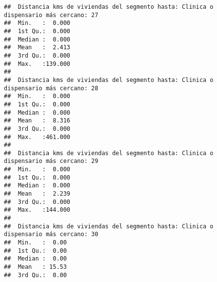 \documentclass[11pt,]{article}
\begin{document}
\begin{verbatim}
##  Distancia kms de viviendas del segmento hasta: Clinica o dispensario más cercano: 27
##  Min.   :  0.000                                                                     
##  1st Qu.:  0.000                                                                     
##  Median :  0.000                                                                     
##  Mean   :  2.413                                                                     
##  3rd Qu.:  0.000                                                                     
##  Max.   :139.000                                                                     
##                                                                                      
##  Distancia kms de viviendas del segmento hasta: Clinica o dispensario más cercano: 28
##  Min.   :  0.000                                                                     
##  1st Qu.:  0.000                                                                     
##  Median :  0.000                                                                     
##  Mean   :  8.316                                                                     
##  3rd Qu.:  0.000                                                                     
##  Max.   :461.000                                                                     
##                                                                                      
##  Distancia kms de viviendas del segmento hasta: Clinica o dispensario más cercano: 29
##  Min.   :  0.000                                                                     
##  1st Qu.:  0.000                                                                     
##  Median :  0.000                                                                     
##  Mean   :  2.239                                                                     
##  3rd Qu.:  0.000                                                                     
##  Max.   :144.000                                                                     
##                                                                                      
##  Distancia kms de viviendas del segmento hasta: Clinica o dispensario más cercano: 30
##  Min.   :  0.00                                                                      
##  1st Qu.:  0.00                                                                      
##  Median :  0.00                                                                      
##  Mean   : 15.53                                                                      
##  3rd Qu.:  0.00                                                                      

\end{verbatim}
\end{document}
